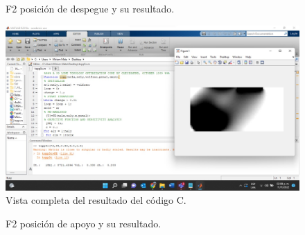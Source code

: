 \documentclass{article}
\begin{document}
\begin{figure}[htp]
  \centering
  \hfill
  \caption{F2 posición de despegue y su resultado.}
\end{figure}
\newpage
\begin{figure}[htp] %
    \centering
    \includegraphics[width=150mm]{ocr.jpeg} %
    \caption{Vista completa del resultado del código C.}
    \label{grafica}
\end{figure}
\begin{figure}[htp]
  \centering
  \hfill
  \caption{F2 posición de apoyo y su resultado.}
\end{figure}
 \newpage
\end{document}
